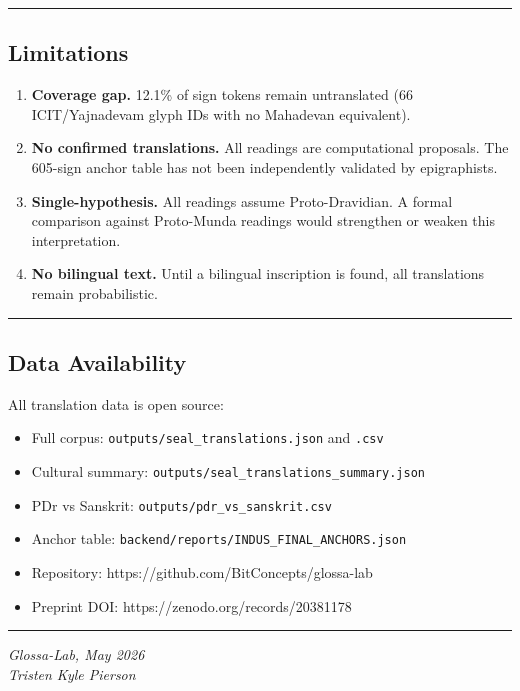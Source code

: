 \documentclass[
  11pt,
]{article}
\providecommand{\tightlist}{%
  \setlength{\itemsep}{0pt}\setlength{\parskip}{0pt}}
\begin{document}
\begin{center}\rule{0.5\linewidth}{0.5pt}\end{center}

\subsection{Limitations}\label{limitations}

\begin{enumerate}
\def\labelenumi{\arabic{enumi}.}
\tightlist
\item
  \textbf{Coverage gap.} 12.1\% of sign tokens remain untranslated (66
  ICIT/Yajnadevam glyph IDs with no Mahadevan equivalent).
\item
  \textbf{No confirmed translations.} All readings are computational
  proposals. The 605-sign anchor table has not been independently
  validated by epigraphists.
\item
  \textbf{Single-hypothesis.} All readings assume Proto-Dravidian. A
  formal comparison against Proto-Munda readings would strengthen or
  weaken this interpretation.
\item
  \textbf{No bilingual text.} Until a bilingual inscription is found,
  all translations remain probabilistic.
\end{enumerate}

\begin{center}\rule{0.5\linewidth}{0.5pt}\end{center}

\subsection{Data Availability}\label{data-availability}

All translation data is open source:

\begin{itemize}
\tightlist
\item
  Full corpus: \texttt{outputs/seal\_translations.json} and
  \texttt{.csv}
\item
  Cultural summary: \texttt{outputs/seal\_translations\_summary.json}
\item
  PDr vs Sanskrit: \texttt{outputs/pdr\_vs\_sanskrit.csv}
\item
  Anchor table: \texttt{backend/reports/INDUS\_FINAL\_ANCHORS.json}
\item
  Repository: https://github.com/BitConcepts/glossa-lab
\item
  Preprint DOI: https://zenodo.org/records/20381178
\end{itemize}

\begin{center}\rule{0.5\linewidth}{0.5pt}\end{center}

\emph{Glossa-Lab, May 2026}\\
\emph{Tristen Kyle Pierson}
\end{document}
